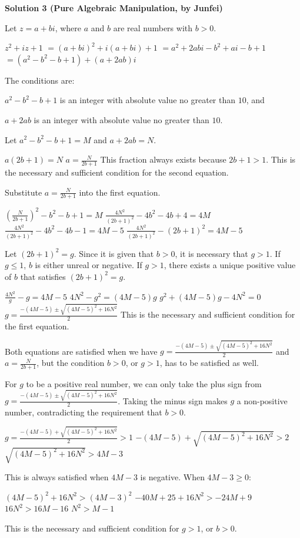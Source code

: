 \begin{enumerate}
 



\textbf{Solution 3 (Pure Algebraic Manipulation, by Junfei)}

Let $z=a+bi$, where $a$ and $b$ are real numbers with $b>0$.

 
$z^2+iz+1$
$=(a+bi)^2+i(a+bi)+1$
$=a^2+2abi-b^2+ai-b+1$
$=(a^2-b^2-b+1)+(a+2ab)i$

 
The conditions are:

 $a^2-b^2-b+1$ is an integer with absolute value no greater than $10$, and

 $a+2ab$ is an integer with absolute value no greater than $10$.

 
Let $a^2-b^2-b+1=M$ and $a+2ab=N$.

 
$a(2b+1)=N$
$a=\frac{N}{2b+1}$ This fraction always exists because $2b+1>1$. This is the necessary and sufficient condition for the second equation.

 
Substitute $a=\frac{N}{2b+1}$ into the first equation.

 $(\frac{N}{2b+1})^2-b^2-b+1=M$
$\frac{4N^2}{(2b+1)^2}-4b^2-4b+4=4M$
$\frac{4N^2}{(2b+1)^2}-4b^2-4b-1=4M-5$
$\frac{4N^2}{(2b+1)^2}-(2b+1)^2=4M-5$

 
Let $(2b+1)^2=g$. Since it is given that $b>0$, it is necessary that $g>1$. If $g\leq{1}$, $b$ is either unreal or negative. If $g>1$, there exists a unique positive value of $b$ that satisfies $(2b+1)^2=g$.

 
$\frac{4N^2}{g}-g=4M-5$
$4N^2-g^2=(4M-5)g$
$g^2+(4M-5)g-4N^2=0$
$g=\frac{-(4M-5)\pm\sqrt{(4M-5)^2+16N^2}}{2}$ This is the necessary and sufficient condition for the first equation. 

 
Both equations are satisfied when we have $g=\frac{-(4M-5)\pm\sqrt{(4M-5)^2+16N^2}}{2}$ and $a=\frac{N}{2b+1}$, but the condition $b>0$, or $g>1$, has to be satisfied as well.

 
For $g$ to be a positive real number, we can only take the plus sign from $g=\frac{-(4M-5)\pm\sqrt{(4M-5)^2+16N^2}}{2}$. Taking the minus sign makes $g$ a non-positive number, contradicting the requirement that $b>0$.

 $g=\frac{-(4M-5)+\sqrt{(4M-5)^2+16N^2}}{2}>1$
$-(4M-5)+\sqrt{(4M-5)^2+16N^2}>2$
$\sqrt{(4M-5)^2+16N^2}>4M-3$

 This is always satisfied when $4M-3$ is negative. When $4M-3\geq 0$:

 $(4M-5)^2+16N^2>(4M-3)^2$
$-40M+25+16N^2>-24M+9$
$16N^2>16M-16$
$N^2>M-1$

 
This is the necessary and sufficient condition for $g>1$, or $b>0$.


\end{enumerate}
